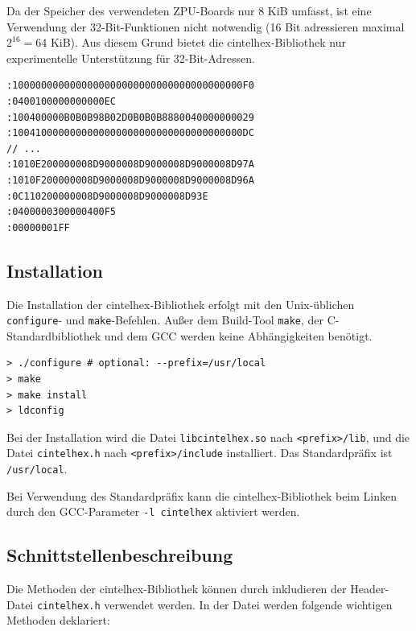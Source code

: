 \documentclass[11pt]{scrartcl}
\begin{document}
Da der Speicher des verwendeten ZPU-Boards nur 8 KiB umfasst, ist eine Verwendung der 32-Bit-Funktionen nicht notwendig (16 Bit adressieren maximal $2^{16} = 64$ KiB). Aus diesem Grund bietet die cintelhex-Bibliothek nur experimentelle Unterstützung für 32-Bit-Adressen.

\begin{lstlisting}[caption=Beispiel einer Intel HEX-Eingabedatei]
:1000000000000000000000000000000000000000F0
:0400100000000000EC
:100400000B0B0B98B02D0B0B0B8880040000000029
:1004100000000000000000000000000000000000DC
// ...
:1010E200000008D9000008D9000008D9000008D97A
:1010F200000008D9000008D9000008D9000008D96A
:0C110200000008D9000008D9000008D93E
:0400000300000400F5
:00000001FF
\end{lstlisting}

\subsection{Installation}

Die Installation der cintelhex-Bibliothek erfolgt mit den Unix-üblichen \texttt{configure}- und \texttt{make}-Befehlen. Außer dem Build-Tool \texttt{make}, der C-Standardbibliothek und dem GCC werden keine Abhängigkeiten benötigt.

\begin{lstlisting}[caption=Installation der cintelhex-Bibliothek]
> ./configure # optional: --prefix=/usr/local
> make
> make install
> ldconfig
\end{lstlisting}

Bei der Installation wird die Datei \texttt{libcintelhex.so} nach \texttt{<prefix>/lib}, und die Datei \texttt{cintelhex.h} nach \texttt{<prefix>/include} installiert. Das Standardpräfix ist \texttt{/usr/local}.

Bei Verwendung des Standardpräfix kann die cintelhex-Bibliothek beim Linken durch den GCC-Parameter \texttt{-l cintelhex} aktiviert werden.

\subsection{Schnittstellenbeschreibung}

Die Methoden der cintelhex-Bibliothek können durch inkludieren der Header-Datei \texttt{cintelhex.h} verwendet werden. In der Datei werden folgende wichtigen Methoden deklariert:
\end{document}
